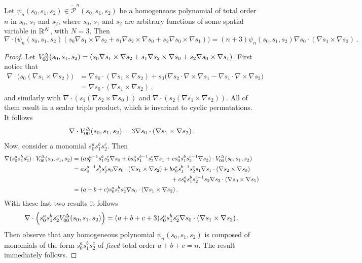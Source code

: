 \begin{lemma}
\label{lem:divformula}
Let $\psi_n(s_0,s_1,s_2)\in\tilde{\mathcal{P}}^n(s_0,s_1,s_2)$ be a homogeneous polynomial of total order $n$ in $s_0$, $s_1$ and $s_2$, where $s_0$, $s_1$ and $s_2$ are arbitrary functions of some spatial variable in $\mathbb{R}^N$, with $N=3$. Then
\begin{equation*}
    \nabla\cdot\Big(\psi_n(s_0,s_1,s_2)(s_0\nabla s_1\times\nabla s_2
			+s_1\nabla s_2\times\nabla s_0+s_2\nabla s_0\times\nabla s_1)\Big)
				\!=\!(n+3)\psi_n(s_0,s_1,s_2)\nabla s_0\cdot(\nabla s_1\times\nabla s_2)\,.
\end{equation*}
\end{lemma}
\begin{proof}
Let $V_{00}^{\Delta}(s_0,s_1,s_2)=(s_0\nabla s_1\times\nabla s_2
			+s_1\nabla s_2\times\nabla s_0+s_2\nabla s_0\times\nabla s_1)$. First notice that
\begin{align*}
	\nabla\cdot \Big(s_0(\nabla s_1\times\nabla s_2)\Big)
		&=\nabla s_0\cdot(\nabla s_1\times\nabla s_2)
			+s_0\Big(\nabla s_2\cdot\nabla\times\nabla s_1-\nabla s_1\cdot\nabla\times\nabla s_2\Big)\\
		&=\nabla s_0\cdot(\nabla s_1\times\nabla s_2)\,,
\end{align*}
and similarly with $\nabla\cdot(s_1(\nabla s_2\times\nabla s_0))$ and $\nabla\cdot(s_2(\nabla s_1\times\nabla s_2))$. All of them result in a scalar triple product, which is invariant to cyclic permutations. It follows
\begin{equation*}
	\nabla\cdot V_{00}^{\Delta}(s_0,s_1,s_2)=3\nabla s_0\cdot(\nabla s_1\times\nabla s_2)\,.
\end{equation*}
Now, consider a monomial $s_0^as_1^bs_2^c$. Then
\begin{align*}
	\nabla(s_0^as_1^bs_2^c)\cdot V_{00}^{\Delta}(s_0,s_1,s_2)
		&=(as_0^{a-1}s_1^bs_2^c\nabla s_0+bs_0^as_1^{b-1}s_2^c\nabla s_1+cs_0^as_1^bs_2^{c-1}\nabla s_2)
			\cdot V_{00}^{\Delta}(s_0,s_1,s_2)\\
		&=as_0^{a-1}s_1^bs_2^cs_0\nabla s_0\cdot(\nabla s_1\times\nabla s_2)
			+bs_0^as_1^{b-1}s_2^cs_1\nabla s_1\cdot(\nabla s_2\times\nabla s_0)\\
				&\qquad\qquad\qquad\qquad\qquad\qquad\qquad\qquad+cs_0^as_1^bs_2^{c-1}s_2\nabla s_2\cdot(\nabla s_0\times\nabla s_1)\\
		&=(a+b+c)s_0^as_1^bs_2^c\nabla s_0\cdot(\nabla s_1\times\nabla s_2)\,.
\end{align*}
With these last two results it follows
\begin{equation*}
	\nabla\cdot\Big(s_0^as_1^bs_2^cV_{00}^{\Delta}(s_0,s_1,s_2)\Big)=(a+b+c+3)s_0^as_1^bs_2^c\nabla s_0\cdot(\nabla s_1\times\nabla s_2)\,.
\end{equation*}
Then observe that any homogeneous polynomial $\psi_n(s_0,s_1,s_2)$ is composed of monomials of the form $s_0^as_1^bs_2^c$ of \textit{fixed} total order $a+b+c=n$. The result immediately follows.
\end{proof}

